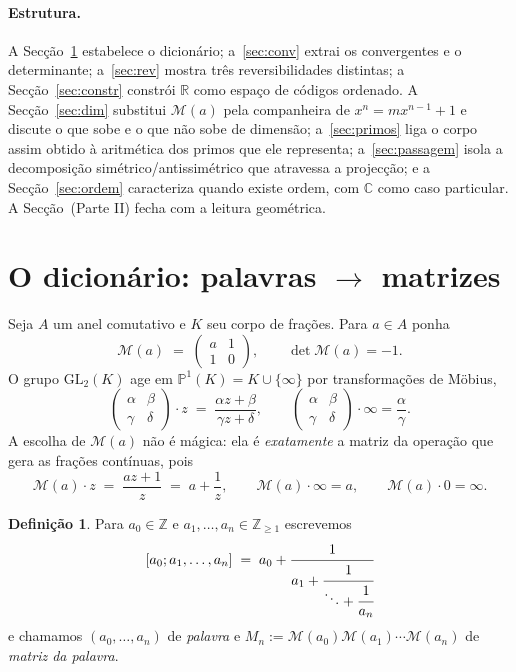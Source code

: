 \documentclass[11pt,a4paper]{article}
\theoremstyle{plain}
\theoremstyle{definition}
\newtheorem{definicao}[teorema]{Definição}
\theoremstyle{remark}
\newcommand{\R}{\mathbb{R}}
\newcommand{\C}{\mathbb{C}}
\newcommand{\Z}{\mathbb{Z}}
\newcommand{\Pj}{\mathbb{P}^1}
\newcommand{\Mat}[1]{\mathcal{M}(#1)}
\newcommand{\GL}{\mathrm{GL}}
\newcommand{\cf}[2]{[#1;#2]}
\begin{document}
\paragraph{Estrutura.} A Secção~\ref{sec:dic} estabelece o dicionário; a~\ref{sec:conv} extrai os
convergentes e o determinante; a~\ref{sec:rev} mostra três reversibilidades distintas; a
Secção~\ref{sec:constr} constrói $\R$ como espaço de códigos ordenado. A Secção~\ref{sec:dim}
substitui $\Mat a$ pela companheira de $x^n = mx^{n-1}+1$ e discute o que sobe e o que não sobe de
dimensão; a~\ref{sec:primos} liga o corpo assim obtido à aritmética dos primos que ele representa;
a~\ref{sec:passagem} isola a decomposição simétrico/antissimétrico que atravessa a projecção; e a
Secção~\ref{sec:ordem} caracteriza quando existe ordem, com $\C$ como caso particular. A
Secção~(Parte II) fecha com a leitura geométrica.

\section{O dicionário: palavras \texorpdfstring{$\to$}{->} matrizes}\label{sec:dic}

Seja $A$ um anel comutativo e $K$ seu corpo de frações. Para $a \in A$ ponha
\[
  \Mat{a} \;=\; \begin{pmatrix} a & 1 \\ 1 & 0 \end{pmatrix},
  \qquad \det \Mat{a} = -1 .
\]
O grupo $\GL_2(K)$ age em $\Pj(K) = K \cup \{\infty\}$ por transformações de Möbius,
\[
  \begin{pmatrix} \alpha & \beta \\ \gamma & \delta \end{pmatrix}\cdot z
  \;=\; \frac{\alpha z + \beta}{\gamma z + \delta},
  \qquad
  \begin{pmatrix} \alpha & \beta \\ \gamma & \delta \end{pmatrix}\cdot \infty = \frac{\alpha}{\gamma}.
\]
A escolha de $\Mat{a}$ não é mágica: ela é \emph{exatamente} a matriz da operação que gera as
frações contínuas, pois
\begin{equation}\label{eq:acao}
  \Mat{a}\cdot z \;=\; \frac{az+1}{z} \;=\; a + \frac{1}{z},
  \qquad \Mat{a}\cdot\infty = a, \qquad \Mat{a}\cdot 0 = \infty .
\end{equation}

\begin{definicao}
Para $a_0 \in \Z$ e $a_1,\dots,a_n \in \Z_{\geq 1}$ escrevemos
\[
  \cf{a_0}{a_1,\dots,a_n} \;=\; a_0 + \cfrac{1}{a_1 + \cfrac{1}{\ddots + \cfrac{1}{a_n}}}
\]
e chamamos $(a_0,\dots,a_n)$ de \emph{palavra} e $M_n := \Mat{a_0}\Mat{a_1}\cdots\Mat{a_n}$
de \emph{matriz da palavra}.
\end{definicao}
\end{document}
